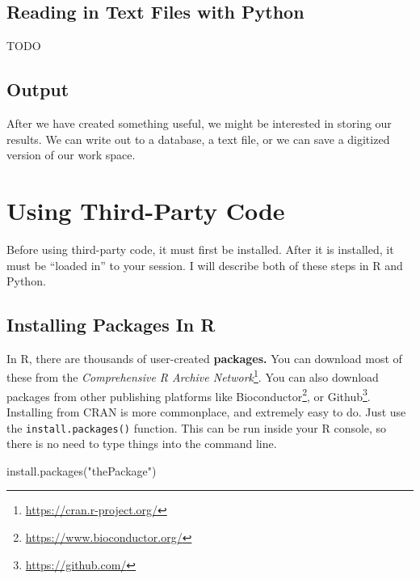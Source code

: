 \documentclass[
  12pt,
]{krantz}
\makeatletter
\newenvironment{Shaded}{\begin{snugshade}}{\end{snugshade}}
\newcommand{\FunctionTok}[1]{\textcolor[rgb]{0,0,0}{#1}}
\newcommand{\NormalTok}[1]{#1}
\newcommand{\StringTok}[1]{\textcolor[rgb]{0.5,0.5,0.5}{#1}}
\renewcommand{\href}[2]{#2\footnote{\url{#1}}}
\newenvironment{kframe}{%
\medskip{}
\setlength{\fboxsep}{.8em}
 \def\at@end@of@kframe{}%
 \ifinner\ifhmode%
  \def\at@end@of@kframe{\end{minipage}}%
  \begin{minipage}{\columnwidth}%
 \fi\fi%
 \def\FrameCommand##1{\hskip\@totalleftmargin \hskip-\fboxsep
 \colorbox{shadecolor}{##1}\hskip-\fboxsep
     \hskip-\linewidth \hskip-\@totalleftmargin \hskip\columnwidth}%
 \MakeFramed {\advance\hsize-\width
   \@totalleftmargin\z@ \linewidth\hsize
   \@setminipage}}%
 {\par\unskip\endMakeFramed%
 \at@end@of@kframe}
\renewenvironment{Shaded}{\begin{kframe}}{\end{kframe}}
\makeatother
\begin{document}
\hypertarget{reading-in-text-files-with-python}{%
\section{Reading in Text Files with Python}\label{reading-in-text-files-with-python}}

TODO

\hypertarget{output}{%
\section{Output}\label{output}}

After we have created something useful, we might be interested in storing our results. We can write out to a database, a text file, or we can save a digitized version of our work space.

\hypertarget{using-third-party-code}{%
\chapter{Using Third-Party Code}\label{using-third-party-code}}

Before using third-party code, it must first be installed. After it is installed, it must be ``loaded in'' to your session. I will describe both of these steps in R and Python.

\hypertarget{installing-packages-in-r}{%
\section{Installing Packages In R}\label{installing-packages-in-r}}

In R, there are thousands of user-created \textbf{packages.} You can download most of these from the \href{https://cran.r-project.org/}{\emph{Comprehensive R Archive Network}}. You can also download packages from other publishing platforms like \href{https://www.bioconductor.org/}{Bioconductor}, or \href{https://github.com/}{Github}. Installing from CRAN is more commonplace, and extremely easy to do. Just use the \texttt{install.packages()} function. This can be run inside your R console, so there is no need to type things into the command line.

\begin{Shaded}
\begin{Highlighting}[]
\FunctionTok{install.packages}\NormalTok{(}\StringTok{"thePackage"}\NormalTok{)}
\end{Highlighting}
\end{Shaded}
\end{document}
